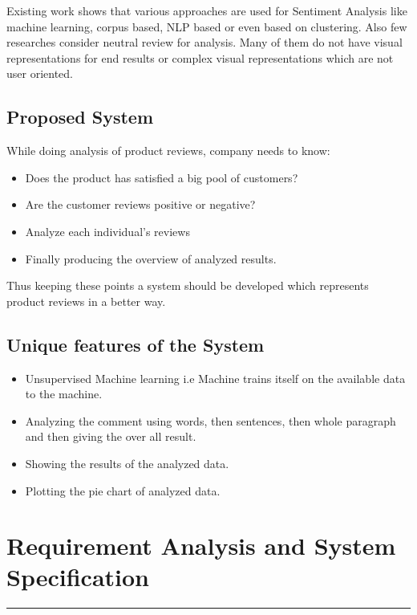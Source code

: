 Existing work shows that various approaches are used for Sentiment Analysis like machine
learning, corpus based, NLP based or even based on clustering. Also few researches consider
neutral review for analysis. Many of them do not have visual representations for end results or
complex visual representations which are not user oriented.

\section{Proposed System}
While doing analysis of product reviews, company needs to know:
\begin{itemize}
	\item Does the product has satisfied a big pool of customers?
	\item Are the customer reviews positive or negative?
	\item Analyze each individual's reviews
    \item Finally producing the overview of analyzed results.
\end{itemize}

Thus keeping these points a system should be developed which represents product reviews in a better way.

\section{Unique features of the System}
\begin{itemize}
	\item Unsupervised Machine learning i.e Machine trains itself on the available data to the machine.
	\item Analyzing the comment using words, then sentences, then whole paragraph and then giving the over all result.
	\item Showing the results of the analyzed data.
	\item Plotting the pie chart of analyzed data.
\end{itemize}




\chapter{Requirement Analysis and System Specification }\hrule
\label{Chapter:2}

